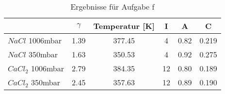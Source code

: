 \begin{enumerate}
\begin{itemize}
		            \begin{table}[H]
			            \centering
			            \begin{tabular}{lccccc}
				            \toprule
				                              & $\gamma$ & Temperatur [K] & I  & A    & C     \\
				            \midrule
				            $NaCl$ 1006mbar   & 1.39     & 377.45         & 4  & 0.82 & 0.219 \\
				            $NaCl$ 350mbar    & 1.63     & 350.53         & 4  & 0.92 & 0.275 \\
				            $CaCl_2$ 1006mbar & 2.79     & 384.35         & 12 & 0.80 & 0.189 \\
				            $CaCl_2$ 350mbar  & 2.45     & 357.63         & 12 & 0.89 & 0.190 \\
				            \bottomrule
			            \end{tabular}
			            \caption{Ergebnisse für Aufgabe f}
		            \end{table}
	      \end{itemize}
\end{enumerate}